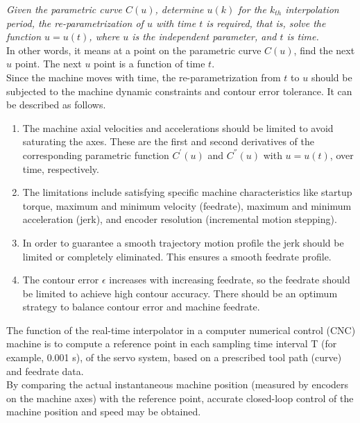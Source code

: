 \textit{Given the parametric curve $C(u)$, determine $u(k)$ for the $k_{th}$ interpolation period, the re-parametrization of $u$ with time $t$ is required, that is, solve the function $u = u(t)$, where $u$ is the independent parameter, and $t$ is time.}\\

In other words, it means at a point on the parametric curve $C(u)$, find the next $u$ point. The next $u$ point is a function of time $t$.\\

Since the machine moves with time, the re-parametrization from $t$ to $u$ should be subjected to the machine dynamic constraints and contour error tolerance. It can be described as follows. 

\begin{enumerate}

\item The machine axial velocities and accelerations should be limited to avoid saturating the axes. These are the ﬁrst and second derivatives of the corresponding parametric function $C^{'}(u)$ and $C^{''}(u)$ with $u = u(t)$, over time, respectively. 

\item The limitations include satisfying specific machine characteristics like startup torque, maximum and minimum velocity (feedrate), maximum and minimum acceleration (jerk), and encoder resolution (incremental motion stepping). 

\item In order to guarantee a smooth trajectory motion proﬁle the jerk should be limited or completely eliminated. This ensures a smooth feedrate profile.  

\item The contour error $\epsilon$ increases with increasing feedrate, so the feedrate should be limited to achieve high contour accuracy. There should be an optimum strategy to balance contour error and machine feedrate.

\end{enumerate}

The function of the real-time interpolator in a computer numerical control (CNC) machine is to compute a reference point in each sampling time interval T (for example, 0.001 s), of the servo system, based on a prescribed tool path (curve) and feedrate data. \\

By comparing the actual instantaneous machine position (measured by encoders on the machine axes) with the reference point, accurate closed-loop control of the machine position and speed may be obtained.\\




